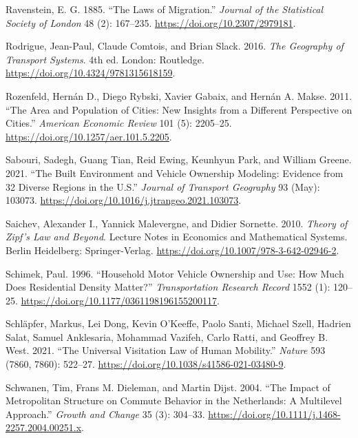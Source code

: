 \documentclass[
  12pt,
]{article}
\newlength{\cslhangindent}
\newlength{\cslentryspacingunit} %
\newenvironment{CSLReferences}[2] %
 {%
  \setlength{\parindent}{0pt}
  \ifodd #1
  \let\oldpar\par
  \def\par{\hangindent=\cslhangindent\oldpar}
  \fi
  \setlength{\parskip}{#2\cslentryspacingunit}
 }%
 {}
\begin{document}
\begin{CSLReferences}{1}{0}
\leavevmode{}%
Ravenstein, E. G. 1885. {``The {Laws} of {Migration}.''} \emph{Journal of the Statistical Society of London} 48 (2): 167--235. \url{https://doi.org/10.2307/2979181}.

\leavevmode{}%
Rodrigue, Jean-Paul, Claude Comtois, and Brian Slack. 2016. \emph{The {Geography} of {Transport Systems}}. 4th ed. {London}: {Routledge}. \url{https://doi.org/10.4324/9781315618159}.

\leavevmode{}%
Rozenfeld, Hernán D., Diego Rybski, Xavier Gabaix, and Hernán A. Makse. 2011. {``The {Area} and {Population} of {Cities}: {New Insights} from a {Different Perspective} on {Cities}.''} \emph{American Economic Review} 101 (5): 2205--25. \url{https://doi.org/10.1257/aer.101.5.2205}.

\leavevmode{}%
Sabouri, Sadegh, Guang Tian, Reid Ewing, Keunhyun Park, and William Greene. 2021. {``The Built Environment and Vehicle Ownership Modeling: {Evidence} from 32 Diverse Regions in the {U}.{S}.''} \emph{Journal of Transport Geography} 93 (May): 103073. \url{https://doi.org/10.1016/j.jtrangeo.2021.103073}.

\leavevmode{}%
Saichev, Alexander I., Yannick Malevergne, and Didier Sornette. 2010. \emph{Theory of {Zipf}'s {Law} and {Beyond}}. Lecture {Notes} in {Economics} and {Mathematical Systems}. {Berlin Heidelberg}: {Springer-Verlag}. \url{https://doi.org/10.1007/978-3-642-02946-2}.

\leavevmode{}%
Schimek, Paul. 1996. {``Household {Motor Vehicle Ownership} and {Use}: {How Much Does Residential Density Matter}?''} \emph{Transportation Research Record} 1552 (1): 120--25. \url{https://doi.org/10.1177/0361198196155200117}.

\leavevmode{}%
Schläpfer, Markus, Lei Dong, Kevin O'Keeffe, Paolo Santi, Michael Szell, Hadrien Salat, Samuel Anklesaria, Mohammad Vazifeh, Carlo Ratti, and Geoffrey B. West. 2021. {``The Universal Visitation Law of Human Mobility.''} \emph{Nature} 593 (7860, 7860): 522--27. \url{https://doi.org/10.1038/s41586-021-03480-9}.

\leavevmode{}%
Schwanen, Tim, Frans M. Dieleman, and Martin Dijst. 2004. {``The {Impact} of {Metropolitan Structure} on {Commute Behavior} in the {Netherlands}: {A Multilevel Approach}.''} \emph{Growth and Change} 35 (3): 304--33. \url{https://doi.org/10.1111/j.1468-2257.2004.00251.x}.


\end{CSLReferences}
\end{document}
